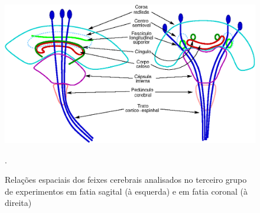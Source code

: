 

 
 
 \begin{figure}[H]
 \includegraphics[width=.9\linewidth, angle=0]{figs/esboco_feixes_antomicos.png}
    \label{fig::esquema_corona_radiata}
    
    \caption{Relações espaciais dos feixes cerebrais analisados no terceiro grupo de experimentos em fatia sagital (à esquerda) e em fatia coronal (à direita)}.
    \label{fig::relacoes_espaciais_feixes}
 \end{figure}

